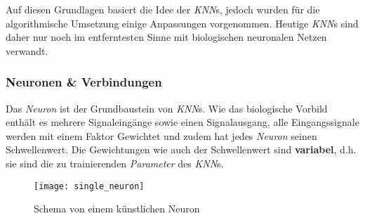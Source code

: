Auf diesen Grundlagen basiert die Idee der \textit{KNN}s, jedoch wurden für die algorithmische Umsetzung einige Anpassungen vorgenommen. Heutige \textit{KNN}s sind daher nur noch im entferntesten Sinne mit biologischen neuronalen Netzen verwandt.

\subsubsection{Neuronen \& Verbindungen}\label{cha:theo:neurons}
Das \textit{Neuron} ist der Grundbaustein von \textit{KNN}s. Wie das biologische Vorbild enthält es mehrere Signaleingänge sowie einen Signalausgang, alle Eingangssignale werden mit einem Faktor Gewichtet und zudem hat jedes \textit{Neuron} seinen Schwellenwert. Die Gewichtungen wie auch der Schwellenwert sind \textbf{variabel}, d.h. sie sind die zu trainierenden \textit{Parameter} des \textit{KNN}s.
\begin{figure}[h]
	\centering
	\texttt{[image: single\_neuron]}
	\caption[Schema von einem künstlichen Neuron]{Schema von einem künstlichen Neuron}
	\label{img:single_neuron}
\end{figure}

